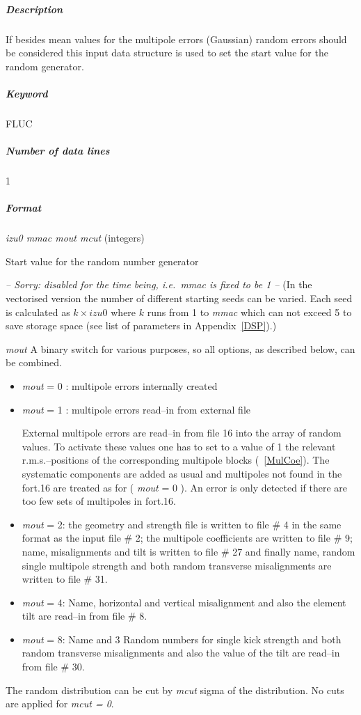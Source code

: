 \documentclass[a4paper,11pt]{report}
\begin{document}
\subparagraph{Description} If besides mean values for the multipole
errors (Gaussian) random errors should be considered this input data
structure is used to set the start value for the random generator.

\subparagraph{Keyword} FLUC \subparagraph{Number of data lines} 1

\subparagraph{Format} {\em izu0 mmac mout mcut} \/(integers)
\begin{description}
\item [izu0] Start value for the random number generator
\item [mmac] {\em \large -- Sorry: disabled for the time being, i.e.\ 
    mmac is fixed to be 1 --} \/({\small In the vectorised version the
    number of different starting seeds can be varied.  Each seed is
    calculated as \mbox{$ k \times izu0 $} where $k$ runs from 1 to
    {\em mmac} \/which can not exceed 5 to save storage space (see
    list of parameters in Appendix~\ref{DSP}).})
\item {\em mout} A binary switch for various purposes, so all options,
  as described below, can be combined. 
\begin{itemize}
\item {\em mout} \/= 0 : multipole errors internally created
\item {\em mout} \/= 1 : multipole errors read--in from external file
  
  External multipole errors are read--in from file 16 into the array
  of random values. To activate these values one has to set to a value
  of 1 the relevant r.m.s.--positions of the corresponding multipole
  blocks (~\ref{MulCoe}). The systematic components are added as usual
  and multipoles not found in the fort.16 are treated as for ({\em
    mout} \/= 0 ). An error is only detected if there are too few sets
  of multipoles in fort.16.
\item {\em mout} \/= 2: the geometry and strength file is written to
  file \# 4 in the same format as the input file \# 2; the multipole
  coefficients are written to file \# 9; name, misalignments and tilt
  is written to file \# 27 and finally name, random single multipole
  strength and both random transverse misalignments are written to
  file \# 31.
\item {\em mout} \/= 4: Name, horizontal and vertical misalignment and
  also the element tilt are read--in from file \# 8.
\item {\em mout} \/= 8: Name and 3 Random numbers for single kick
  strength and both random transverse misalignments and also the value
  of the tilt are read--in from file \# 30. 
\end{itemize}
\item [mcut] The random distribution can be cut by {\em mcut} \/sigma
  of the distribution. No cuts are applied for {\em mcut = 0}\/.
\end{description}
\end{document}
